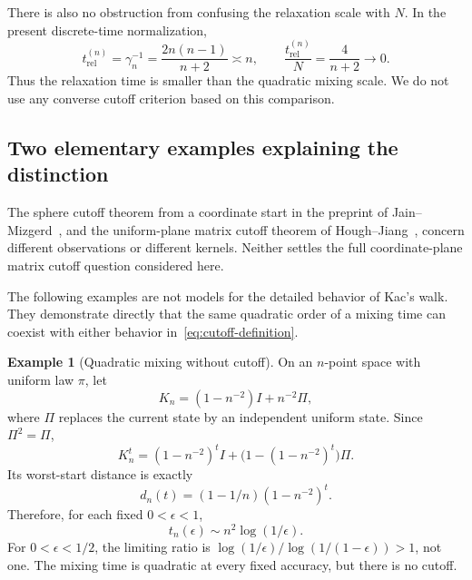 \documentclass[11pt]{article}
\theoremstyle{definition}\newtheorem{definition}[theorem]{Definition}
\newtheorem{example}[theorem]{Example}
\theoremstyle{remark}\newtheorem{remark}[theorem]{Remark}
\begin{document}
There is also no obstruction from confusing the relaxation scale with $N$. In the present discrete-time normalization,
\[
 t_{\mathrm{rel}}^{(n)}=\gamma_n^{-1}
 =\frac{2n(n-1)}{n+2}\asymp n,
 \qquad
 \frac{t_{\mathrm{rel}}^{(n)}}{N}=\frac4{n+2}\longrightarrow0.
\]
Thus the relaxation time is smaller than the quadratic mixing scale. We do not use any converse cutoff criterion based on this comparison.

\subsection{Two elementary examples explaining the distinction}
The sphere cutoff theorem from a coordinate start in the preprint of Jain--Mizgerd~\cite{JM26}, and the uniform-plane matrix cutoff theorem of Hough--Jiang~\cite{HJ17}, concern different observations or different kernels. Neither settles the full coordinate-plane matrix cutoff question considered here.

The following examples are not models for the detailed behavior of Kac's walk. They demonstrate directly that the same quadratic order of a mixing time can coexist with either behavior in~\eqref{eq:cutoff-definition}.

\begin{example}[Quadratic mixing without cutoff]\label{ex:no-cutoff}
On an $n$-point space with uniform law $\pi$, let
\[
 K_n=(1-n^{-2})I+n^{-2}\Pi,
\]
where $\Pi$ replaces the current state by an independent uniform state. Since $\Pi^2=\Pi$,
\[
 K_n^t=(1-n^{-2})^tI+\bigl(1-(1-n^{-2})^t\bigr)\Pi.
\]
Its worst-start distance is exactly
\[
 d_n(t)=(1-1/n)(1-n^{-2})^t.
\]
Therefore, for each fixed $0<\epsilon<1$,
\[
 t_n(\epsilon)\sim n^2\log(1/\epsilon).
\]
For $0<\epsilon<1/2$, the limiting ratio is
$\log(1/\epsilon)/\log(1/(1-\epsilon))>1$, not one. The mixing time is quadratic at every fixed accuracy, but there is no cutoff.
\end{example}
\end{document}

